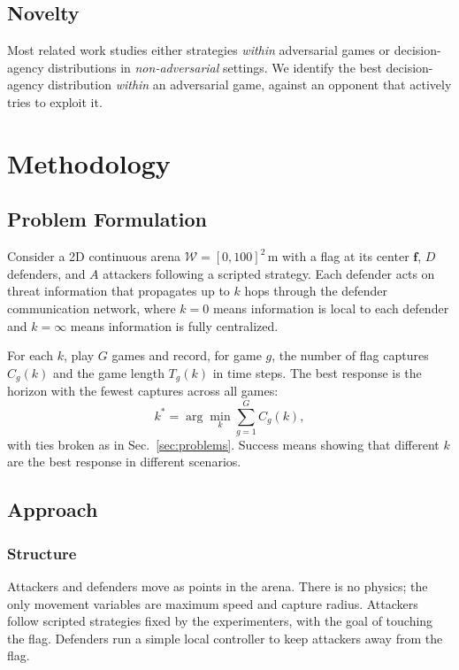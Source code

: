 \documentclass[conference]{IEEEtran}
\newcommand{\nD}{D}            %
\newcommand{\nA}{A}            %
\newcommand{\nG}{G}            %
\newcommand{\hor}{k}           %
\begin{document}
\subsection{Novelty}
Most related work studies either strategies \emph{within} adversarial games or decision-agency distributions in \emph{non-adversarial} settings. We identify the best decision-agency distribution \emph{within} an adversarial game, against an opponent that actively tries to exploit it.

\section{Methodology}
\label{sec:method}

\subsection{Problem Formulation}
Consider a 2D continuous arena $\mathcal{W} = [0, 100]^2$\,m with a flag at its center $\mathbf{f}$, $\nD$ defenders, and $\nA$ attackers following a scripted strategy. Each defender acts on threat information that propagates up to $\hor$ hops through the defender communication network, where $\hor = 0$ means information is local to each defender and $\hor = \infty$ means information is fully centralized.

For each $\hor$, play $\nG$ games and record, for game $g$, the number of flag captures $C_g(\hor)$ and the game length $T_g(\hor)$ in time steps. The best response is the horizon with the fewest captures across all games:
\begin{equation}
  \hor^* = \arg\min_{\hor} \sum_{g=1}^{\nG} C_g(\hor),
  \label{eq:best-response}
\end{equation}
with ties broken as in Sec.~\ref{sec:problems}. Success means showing that different $\hor$ are the best response in different scenarios.

\subsection{Approach}

\subsubsection{Structure}
Attackers and defenders move as points in the arena. There is no physics; the only movement variables are maximum speed and capture radius. Attackers follow scripted strategies fixed by the experimenters, with the goal of touching the flag. Defenders run a simple local controller to keep attackers away from the flag.
\end{document}
